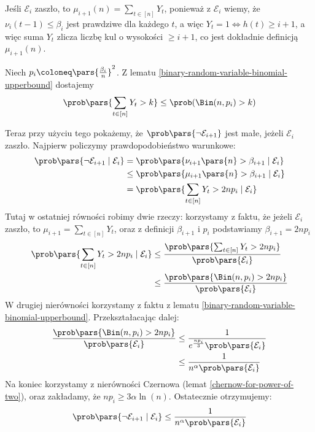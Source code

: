 Jeśli \(\mathcal{E}_i\) zaszło, to \(\mu_{i+1}(n) = \sum_{t \in [n]} Y_t\), ponieważ z \(\mathcal{E}_i\) wiemy, że \(\nu_i(t - 1) \leq \beta_i\) jest prawdziwe dla każdego \(t\), a więc \(Y_t = 1 \iff h(t) \geq i + 1\), a więc suma \(Y_t\) zlicza liczbę kul o wysokości \(\geq i + 1\), co jest dokładnie definicją \(\mu_{i+1}(n)\).

Niech \(p_i \coloneq \pars{\frac{\beta_i}{n}}^2\). Z lematu \ref{binary-random-variable-binomial-upperbound} dostajemy
\[
	\prob\pars{\sum_{t \in [n]} Y_t > k} \leq \prob(\Bin(n, p_i) > k)
\]

Teraz przy użyciu tego pokażemy, że \( \prob\pars{\neg\mathcal{E}_{i+1}} \) jest małe, jeżeli \( \mathcal{E}_i \) zaszło.
Najpierw policzymy prawdopodobieństwo warunkowe:
\begin{align*}
	\prob\pars{\neg\mathcal{E}_{i+1} \mid \mathcal{E}_i} & = \prob\pars{\nu_{i+1}\pars{n} > \beta_{i+1} \mid \mathcal{E}_i}    \\
	                                                     & \leq \prob\pars{\mu_{i+1}\pars{n} > \beta_{i+1} \mid \mathcal{E}_i} \\
	                                                     & = \prob\pars{\sum_{t \in [n]} Y_t > 2np_i \mid \mathcal{E}_i}       \\
\end{align*}
Tutaj w ostatniej równości robimy dwie rzeczy: korzystamy z faktu, że jeżeli \( \mathcal{E}_i \) zaszło, to \(\mu_{i+1} = \sum_{t \in [n]} Y_t \), oraz
z definicji \( \beta_{i+1} \) i \( p_i \) podstawiamy \( \beta_{i+1} = 2np_i \)
\begin{align*}
	\prob\pars{\sum_{t \in [n]} Y_t > 2np_i \mid \mathcal{E}_i} & \leq \frac{\prob\pars{\sum_{t \in [n]} Y_t > 2np_i}}{\prob\pars{\mathcal{E}_i}} \\
	                                                            & \leq \frac{\prob\pars{\Bin(n,p_i) > 2np_i}}{\prob\pars{\mathcal{E}_i}}          \\
\end{align*}
W drugiej nierówności korzystamy z faktu z lematu \ref{binary-random-variable-binomial-upperbound}. Przekształacając dalej:
\begin{align*}
	\frac{\prob\pars{\Bin(n,p_i) > 2np_i}}{\prob\pars{\mathcal{E}_i}} & \leq \frac{1}{e^{\frac{np_i}{3}}\prob\pars{\mathcal{E}_i}} \\
	                                                                  & \leq \frac{1}{n^{\alpha}\prob\pars{\mathcal{E}_i}}
\end{align*}
Na koniec korzystamy z nierówności Czernowa (lemat \ref{chernow-for-power-of-two}), oraz zakładamy, że \( np_i \geq 3\alpha\ln(n) \).
Ostatecznie otrzymujemy:
\[
	\prob\pars{\neg\mathcal{E}_{i+1} \mid \mathcal{E}_i} \leq \frac{1}{n^{\alpha}\prob\pars{\mathcal{E}_i}}
\]

